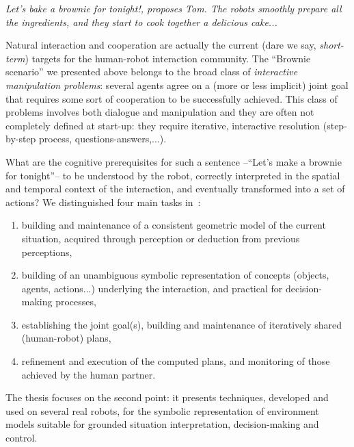 {\em \emph{Let's bake a brownie for tonight!}, proposes Tom. The robots
smoothly prepare all the ingredients, and they start to cook together a
delicious cake...}

Natural interaction and cooperation are actually the current (dare we say,
\emph{short-term}) targets for the human-robot interaction community.  The
``Brownie scenario'' we presented above belongs to the broad class of
\emph{interactive manipulation problems}: several agents agree on a (more or
less implicit) joint goal that requires some sort of cooperation to be
successfully achieved. This class of problems involves both dialogue and
manipulation and they are often not completely defined at start-up: they require
iterative, interactive resolution (step-by-step process,
questions-answers,...).

What are the cognitive prerequisites for such a sentence --``Let's make a
brownie for tonight''-- to be understood by the robot, correctly interpreted in
the spatial and temporal context of the interaction, and eventually transformed
into a set of actions? We distinguished four main tasks in~\cite{Lemaignan2012}:

\begin{enumerate}

    \item building and maintenance of a consistent geometric model of the
        current situation, acquired through perception or deduction from
        previous perceptions,

    \item building of an unambiguous symbolic representation of concepts
        (objects, agents, actions...) underlying the interaction, and practical
        for decision-making processes,

    \item establishing the joint goal(s), building and maintenance of
        iteratively shared (human-robot) plans, 

    \item refinement and execution of the computed plans, and monitoring of
        those achieved by the human partner.

\end{enumerate}

The thesis focuses on the second point: it presents techniques, developed and
used on several real robots, for the symbolic representation of environment
models suitable for grounded situation interpretation, decision-making and
control.

